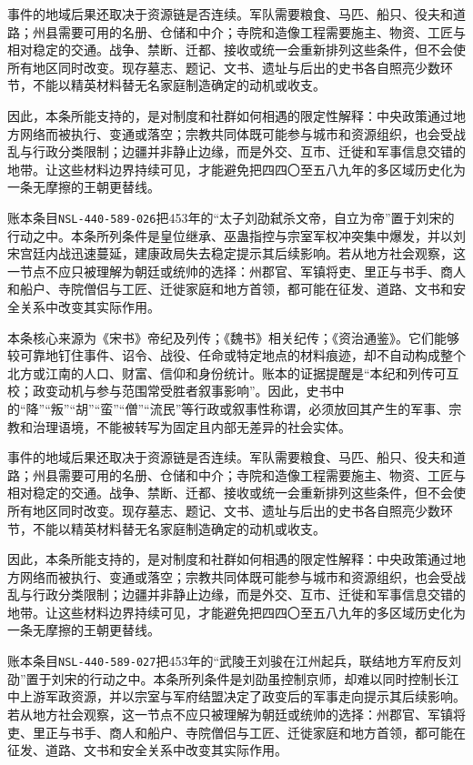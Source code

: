 事件的地域后果还取决于资源链是否连续。军队需要粮食、马匹、船只、役夫和道路；州县需要可用的名册、仓储和中介；寺院和造像工程需要施主、物资、工匠与相对稳定的交通。战争、禁断、迁都、接收或统一会重新排列这些条件，但不会使所有地区同时改变。现存墓志、题记、文书、遗址与后出的史书各自照亮少数环节，不能以精英材料替无名家庭制造确定的动机或收支。

因此，本条所能支持的，是对制度和社群如何相遇的限定性解释：中央政策通过地方网络而被执行、变通或落空；宗教共同体既可能参与城市和资源组织，也会受战乱与行政分类限制；边疆并非静止边缘，而是外交、互市、迁徙和军事信息交错的地带。让这些材料边界持续可见，才能避免把四四〇至五八九年的多区域历史化为一条无摩擦的王朝更替线。

账本条目\texttt{NSL-440-589-026}把453年的“太子刘劭弑杀文帝，自立为帝”置于刘宋的行动之中。本条所列条件是皇位继承、巫蛊指控与宗室军权冲突集中爆发，并以刘宋宫廷内战迅速蔓延，建康政局失去稳定提示其后续影响。若从地方社会观察，这一节点不应只被理解为朝廷或统帅的选择：州郡官、军镇将吏、里正与书手、商人和船户、寺院僧侣与工匠、迁徙家庭和地方首领，都可能在征发、道路、文书和安全关系中改变其实际作用。

本条核心来源为《宋书》帝纪及列传；《魏书》相关纪传；《资治通鉴》。它们能够较可靠地钉住事件、诏令、战役、任命或特定地点的材料痕迹，却不自动构成整个北方或江南的人口、财富、信仰和身份统计。账本的证据提醒是“本纪和列传可互校；政变动机与参与范围常受胜者叙事影响”。因此，史书中的“降”“叛”“胡”“蛮”“僧”“流民”等行政或叙事性称谓，必须放回其产生的军事、宗教和治理语境，不能被转写为固定且内部无差异的社会实体。

事件的地域后果还取决于资源链是否连续。军队需要粮食、马匹、船只、役夫和道路；州县需要可用的名册、仓储和中介；寺院和造像工程需要施主、物资、工匠与相对稳定的交通。战争、禁断、迁都、接收或统一会重新排列这些条件，但不会使所有地区同时改变。现存墓志、题记、文书、遗址与后出的史书各自照亮少数环节，不能以精英材料替无名家庭制造确定的动机或收支。

因此，本条所能支持的，是对制度和社群如何相遇的限定性解释：中央政策通过地方网络而被执行、变通或落空；宗教共同体既可能参与城市和资源组织，也会受战乱与行政分类限制；边疆并非静止边缘，而是外交、互市、迁徙和军事信息交错的地带。让这些材料边界持续可见，才能避免把四四〇至五八九年的多区域历史化为一条无摩擦的王朝更替线。

账本条目\texttt{NSL-440-589-027}把453年的“武陵王刘骏在江州起兵，联结地方军府反刘劭”置于刘宋的行动之中。本条所列条件是刘劭虽控制京师，却难以同时控制长江中上游军政资源，并以宗室与军府结盟决定了政变后的军事走向提示其后续影响。若从地方社会观察，这一节点不应只被理解为朝廷或统帅的选择：州郡官、军镇将吏、里正与书手、商人和船户、寺院僧侣与工匠、迁徙家庭和地方首领，都可能在征发、道路、文书和安全关系中改变其实际作用。

